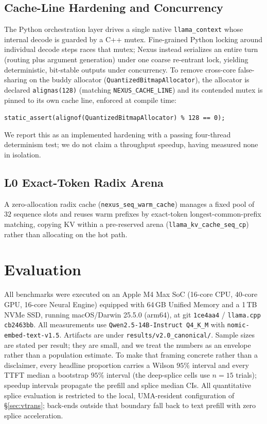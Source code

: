 \documentclass[10pt,conference]{IEEEtran}
\newcommand{\code}[1]{\texttt{\small #1}}
\begin{document}
\subsection{Cache-Line Hardening and Concurrency}
The Python orchestration layer drives a single native \code{llama\_context} whose internal decode
is guarded by a C++ mutex. Fine-grained Python locking around individual decode steps races that
mutex; Nexus instead serializes an entire turn (routing plus argument generation) under one coarse
re-entrant lock, yielding deterministic, bit-stable outputs under concurrency. To remove
cross-core false-sharing on the buddy allocator (\code{QuantizedBitmapAllocator}), the allocator is
declared \code{alignas(128)} (matching \code{NEXUS\_CACHE\_LINE}) and its contended mutex is pinned
to its own cache line, enforced at compile time:
\begin{center}\small
\code{static\_assert(alignof(QuantizedBitmapAllocator) \% 128 == 0);}
\end{center}
We report this as an implemented hardening with a passing four-thread determinism test; we do not
claim a throughput speedup, having measured none in isolation.

\subsection{L0 Exact-Token Radix Arena}
A zero-allocation radix cache (\code{nexus\_seq\_warm\_cache}) manages a fixed pool of $32$ sequence
slots and reuses warm prefixes by exact-token longest-common-prefix matching, copying KV within a
pre-reserved arena (\code{llama\_kv\_cache\_seq\_cp}) rather than allocating on the hot path.

\section{Evaluation}
\label{sec:eval}
All benchmarks were executed on an Apple M4 Max SoC (16-core CPU, 40-core GPU, 16-core Neural Engine) equipped with 64\,GB Unified Memory and a 1\,TB NVMe SSD, running macOS/Darwin 25.5.0 (arm64), at git \code{1ce4aa4} / \code{llama.cpp cb2463bb}. All measurements use \code{Qwen2.5-14B-Instruct Q4\_K\_M} with \code{nomic-embed-text-v1.5}. Artifacts are under \code{results/v2.0\_canonical/}. Sample sizes are stated per result; they are small, and we treat the numbers as an envelope rather than a population estimate. To make that framing concrete rather than a disclaimer, every headline proportion carries a Wilson $95\%$ interval and every TTFT median a bootstrap $95\%$ interval (the deep-splice cells use $n{=}15$ trials); speedup intervals propagate the prefill and splice median CIs. All quantitative splice
evaluation is restricted to the local, UMA-resident configuration of \S\ref{sec:vtrans};
back-ends outside that boundary fall back to text prefill with zero splice acceleration.
\end{document}
